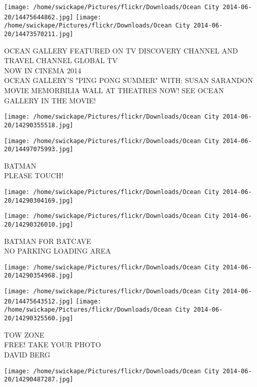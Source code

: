 \documentclass[10pt,letterpaper]{article}
\begin{document}
\vspace{0.25in}
\texttt{[image: /home/swickape/Pictures/flickr/Downloads/Ocean City 2014-06-20/14475644862.jpg]}
\texttt{[image: /home/swickape/Pictures/flickr/Downloads/Ocean City 2014-06-20/14473570211.jpg]}

OCEAN GALLERY FEATURED ON TV DISCOVERY CHANNEL AND TRAVEL CHANNEL GLOBAL TV\\
NOW IN CINEMA 2014\\
OCEAN GALLERY'S "PING PONG SUMMER" WITH: SUSAN SARANDON MOVIE MEMORBILIA WALL AT THEATRES NOW!  SEE OCEAN GALLERY IN THE MOVIE!\\
\pagebreak

\texttt{[image: /home/swickape/Pictures/flickr/Downloads/Ocean City 2014-06-20/14290355518.jpg]}

\vspace{0.25in}
\texttt{[image: /home/swickape/Pictures/flickr/Downloads/Ocean City 2014-06-20/14497075993.jpg]}

BATMAN\\
PLEASE TOUCH!\\
\pagebreak

\texttt{[image: /home/swickape/Pictures/flickr/Downloads/Ocean City 2014-06-20/14290304169.jpg]}

\vspace{0.25in}
\texttt{[image: /home/swickape/Pictures/flickr/Downloads/Ocean City 2014-06-20/14290326010.jpg]}

BATMAN FOR BATCAVE\\
NO PARKING LOADING AREA\\
\pagebreak

\texttt{[image: /home/swickape/Pictures/flickr/Downloads/Ocean City 2014-06-20/14290354968.jpg]}

\vspace{0.25in}
\texttt{[image: /home/swickape/Pictures/flickr/Downloads/Ocean City 2014-06-20/14475643512.jpg]}
\texttt{[image: /home/swickape/Pictures/flickr/Downloads/Ocean City 2014-06-20/14290325560.jpg]}

TOW ZONE\\
FREE!  TAKE YOUR PHOTO\\
DAVID BERG\\
\pagebreak

\texttt{[image: /home/swickape/Pictures/flickr/Downloads/Ocean City 2014-06-20/14290487287.jpg]}
\end{document}
